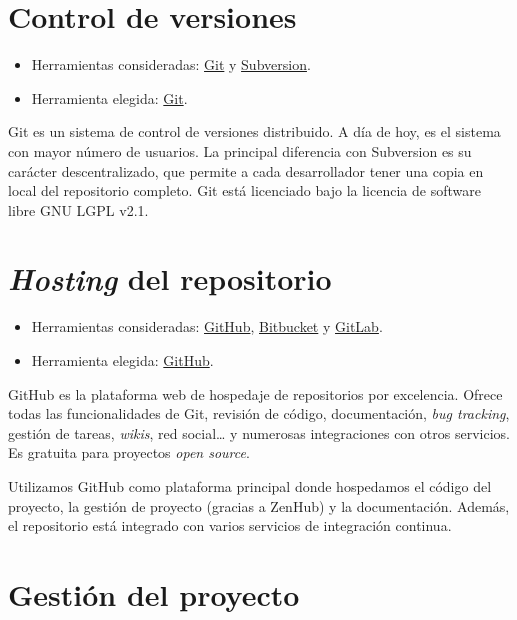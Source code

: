 
\section{Control de versiones}\label{control-de-versiones}

\begin{itemize}
\tightlist
\item
  Herramientas consideradas: \href{https://git-scm.com/}{Git} y
  \href{https://subversion.apache.org/}{Subversion}.
\item
  Herramienta elegida: \href{https://git-scm.com/}{Git}.
\end{itemize}

Git es un sistema de control de versiones distribuido. A día de hoy, es
el sistema con mayor número de usuarios. La principal diferencia con
Subversion es su carácter descentralizado, que permite a cada
desarrollador tener una copia en local del repositorio completo. Git
está licenciado bajo la licencia de software libre GNU LGPL v2.1.

\section{\emph{Hosting} del repositorio}\label{hosting-del-repositorio}

\begin{itemize}
\tightlist
\item
  Herramientas consideradas: \href{https://github.com/}{GitHub},
  \href{https://bitbucket.org/}{Bitbucket} y
  \href{https://gitlab.com/}{GitLab}.
\item
  Herramienta elegida: \href{https://github.com/}{GitHub}.
\end{itemize}

GitHub es la plataforma web de hospedaje de repositorios por excelencia.
Ofrece todas las funcionalidades de Git, revisión de código,
documentación, \emph{bug tracking}, gestión de tareas, \emph{wikis}, red
social\ldots{} y numerosas integraciones con otros servicios. Es
gratuita para proyectos \emph{open source}.

Utilizamos GitHub como plataforma principal donde hospedamos el código
del proyecto, la gestión de proyecto (gracias a ZenHub) y la
documentación. Además, el repositorio está integrado con varios
servicios de integración continua.

\section{Gestión del proyecto}\label{gestion-del-proyecto}

